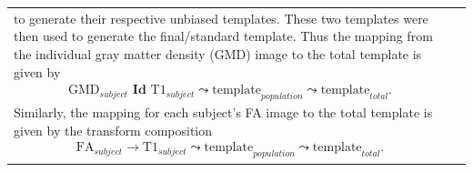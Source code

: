\documentclass[paperwidth=48in,paperheight=48in,portrait,final]{baposter}
\begin{document}
\begin{poster}
{\begin{center}
\begin{tabular}{p{11cm}p{11cm}}
to generate their respective unbiased templates.  These two templates were then
used to generate the final/standard template.  Thus the mapping from the individual 
gray matter density (GMD) image to the total template is given by
\begin{align*}
  \mathrm{GMD}_{subject}\,\,\mathbf{Id}\,\, \mathrm{T1}_{subject}\leadsto \mathrm{template}_{population}\leadsto \mathrm{template}_{total}.
\end{align*}
Similarly, the mapping for each subject's FA image to the total template is given
by the 
transform composition
\begin{align*}
  \mathrm{FA}_{subject}\rightarrow\mathrm{T1}_{subject}\leadsto \mathrm{template}_{population}\leadsto \mathrm{template}_{total}.
\end{align*}
\\
\end{tabular}
\end{center}

\vspace{-10mm}
  }

\end{poster}
\end{document}
